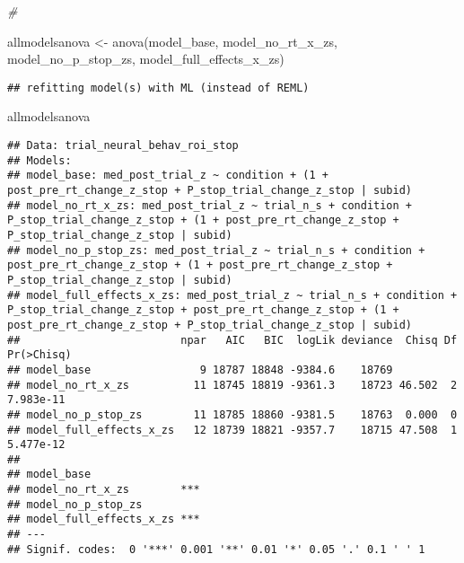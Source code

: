 \documentclass[
]{article}
\newenvironment{Shaded}{\begin{snugshade}}{\end{snugshade}}
\newcommand{\CommentTok}[1]{\textcolor[rgb]{0.56,0.35,0.01}{\textit{#1}}}
\newcommand{\FunctionTok}[1]{\textcolor[rgb]{0.00,0.00,0.00}{#1}}
\newcommand{\NormalTok}[1]{#1}
\newcommand{\OtherTok}[1]{\textcolor[rgb]{0.56,0.35,0.01}{#1}}
\begin{document}
\begin{Shaded}
\begin{Highlighting}[]
\CommentTok{\# }
\end{Highlighting}
\end{Shaded}

\begin{Shaded}
\begin{Highlighting}[]
\NormalTok{allmodelsanova }\OtherTok{\textless{}{-}} \FunctionTok{anova}\NormalTok{(model\_base, model\_no\_rt\_x\_zs, model\_no\_p\_stop\_zs, model\_full\_effects\_x\_zs)}
\end{Highlighting}
\end{Shaded}

\begin{verbatim}
## refitting model(s) with ML (instead of REML)
\end{verbatim}

\begin{Shaded}
\begin{Highlighting}[]
\NormalTok{allmodelsanova}
\end{Highlighting}
\end{Shaded}

\begin{verbatim}
## Data: trial_neural_behav_roi_stop
## Models:
## model_base: med_post_trial_z ~ condition + (1 + post_pre_rt_change_z_stop + P_stop_trial_change_z_stop | subid)
## model_no_rt_x_zs: med_post_trial_z ~ trial_n_s + condition + P_stop_trial_change_z_stop + (1 + post_pre_rt_change_z_stop + P_stop_trial_change_z_stop | subid)
## model_no_p_stop_zs: med_post_trial_z ~ trial_n_s + condition + post_pre_rt_change_z_stop + (1 + post_pre_rt_change_z_stop + P_stop_trial_change_z_stop | subid)
## model_full_effects_x_zs: med_post_trial_z ~ trial_n_s + condition + P_stop_trial_change_z_stop + post_pre_rt_change_z_stop + (1 + post_pre_rt_change_z_stop + P_stop_trial_change_z_stop | subid)
##                         npar   AIC   BIC  logLik deviance  Chisq Df Pr(>Chisq)
## model_base                 9 18787 18848 -9384.6    18769                     
## model_no_rt_x_zs          11 18745 18819 -9361.3    18723 46.502  2  7.983e-11
## model_no_p_stop_zs        11 18785 18860 -9381.5    18763  0.000  0           
## model_full_effects_x_zs   12 18739 18821 -9357.7    18715 47.508  1  5.477e-12
##                            
## model_base                 
## model_no_rt_x_zs        ***
## model_no_p_stop_zs         
## model_full_effects_x_zs ***
## ---
## Signif. codes:  0 '***' 0.001 '**' 0.01 '*' 0.05 '.' 0.1 ' ' 1
\end{verbatim}
\end{document}
